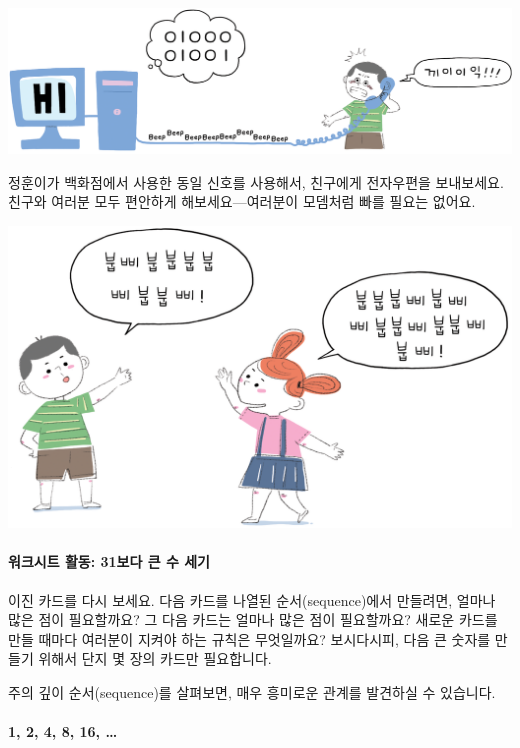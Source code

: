 \documentclass[]{article}
\begin{document}
\includegraphics{csunplugged/01-part/img/ch01-binary/01-binary-07-email-and-modems_01.png}

정훈이가 백화점에서 사용한 동일 신호를 사용해서, 친구에게 전자우편을
보내보세요. 친구와 여러분 모두 편안하게 해보세요---여러분이 모뎀처럼
빠를 필요는 없어요.

\includegraphics{csunplugged/01-part/img/ch01-binary/01-binary-07-email-and-modems_02.png}

\mbox{}\paragraph{워크시트 활동: 31보다 큰 수 세기}\label{section-17}

이진 카드를 다시 보세요. 다음 카드를 나열된 순서(sequence)에서 만들려면,
얼마나 많은 점이 필요할까요? 그 다음 카드는 얼마나 많은 점이 필요할까요?
새로운 카드를 만들 때마다 여러분이 지켜야 하는 규칙은 무엇일까요?
보시다시피, 다음 큰 숫자를 만들기 위해서 단지 몇 장의 카드만 필요합니다.

주의 깊이 순서(sequence)를 살펴보면, 매우 흥미로운 관계를 발견하실 수
있습니다.

\mbox{}\paragraph{1, 2, 4, 8, 16, \ldots{}}\label{section-18}
\end{document}
